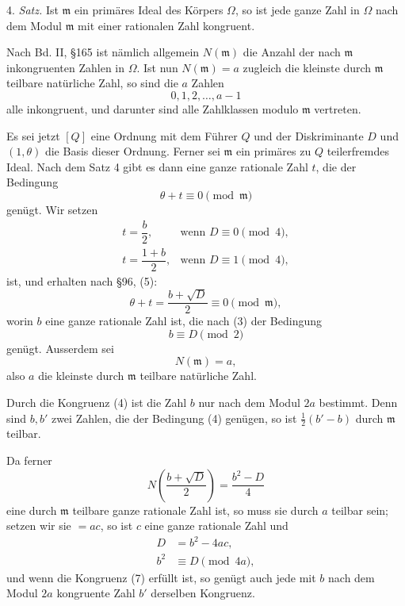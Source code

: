 \documentclass[11pt]{article}
\begin{document}
4. \emph{Satz.} Ist $\mathfrak m$ ein primäres Ideal des Körpers $\Omega$, so ist jede ganze Zahl in $\Omega$ nach dem Modul $\mathfrak m$ mit einer rationalen Zahl kongruent.

Nach Bd. II, \S 165 ist nämlich allgemein $N(\mathfrak m)$ die Anzahl der nach $\mathfrak m$ inkongruenten Zahlen in $\Omega$. Ist nun $N(\mathfrak m)=a$ zugleich die kleinste durch $\mathfrak m$ teilbare natürliche Zahl, so sind die $a$ Zahlen
\[
 0,1,2,\ldots,a-1
\]
alle inkongruent, und darunter sind alle Zahlklassen modulo $\mathfrak m$ vertreten.

Es sei jetzt $[Q]$ eine Ordnung mit dem Führer $Q$ und der Diskriminante $D$ und $(1,\theta)$ die Basis dieser Ordnung. Ferner sei $\mathfrak m$ ein primäres zu $Q$ teilerfremdes Ideal. Nach dem Satz 4 gibt es dann eine ganze rationale Zahl $t$, die der Bedingung
\[
 \theta+t\equiv0\pmod{\mathfrak m}
\]
genügt. Wir setzen
\begin{equation}
\begin{array}{ll}
 t=\dfrac{b}{2}, & \text{wenn }D\equiv0\pmod4,\\[0.8em]
 t=\dfrac{1+b}{2}, & \text{wenn }D\equiv1\pmod4,
\end{array}
\tag{3}
\end{equation}
ist, und erhalten nach \S 96, (5):
\begin{equation}
 \theta+t=\frac{b+\sqrt D}{2}\equiv0\pmod{\mathfrak m},
\tag{4}
\end{equation}
worin $b$ eine ganze rationale Zahl ist, die nach (3) der Bedingung
\[
 b\equiv D\pmod2
\]
genügt. Ausserdem sei
\begin{equation}
 N(\mathfrak m)=a,
\tag{5}
\end{equation}
also $a$ die kleinste durch $\mathfrak m$ teilbare natürliche Zahl.

Durch die Kongruenz (4) ist die Zahl $b$ nur nach dem Modul $2a$ bestimmt. Denn sind $b,b'$ zwei Zahlen, die der Bedingung (4) genügen, so ist $\frac12(b'-b)$ durch $\mathfrak m$ teilbar.

Da ferner
\[
 N\left(\frac{b+\sqrt D}{2}\right)=\frac{b^2-D}{4}
\]
eine durch $\mathfrak m$ teilbare ganze rationale Zahl ist, so muss sie durch $a$ teilbar sein; setzen wir sie $=ac$, so ist $c$ eine ganze rationale Zahl und
\begin{align}
 D&=b^2-4ac,
\tag{6}\\
 b^2&\equiv D\pmod{4a},
\tag{7}
\end{align}
und wenn die Kongruenz (7) erfüllt ist, so genügt auch jede mit $b$ nach dem Modul $2a$ kongruente Zahl $b'$ derselben Kongruenz.
\end{document}

